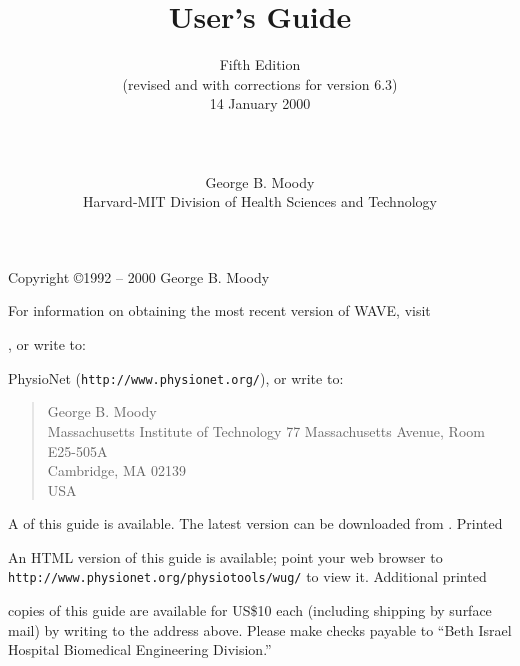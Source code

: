 \documentclass[twoside]{book}
\title{\WAVE{} User's Guide}
\author{Fifth Edition\\
(revised and with corrections for \WAVE{} version 6.3)\\
14 January 2000\\
\\
\\
\\
George B. Moody\\
Harvard-MIT Division of Health Sciences and Technology}
\date{}
\newcommand{\WAVE}{{\sf WAVE}\xspace}
\begin{document}
\begin{htmlonly}
\end{htmlonly}
\begin{latexonly}
\end{latexonly}

\maketitle

\pagestyle{empty}
\vspace*{\fill}
\noindent
Copyright \copyright 1992 -- 2000 George B. Moody

\vspace{1 in}
\noindent
For information on obtaining the most recent version of \WAVE{},
visit
\begin{htmlonly}
, or write to:
\end{htmlonly}
\begin{latexonly}
PhysioNet ({\tt http://www.physionet.org/}), or write to:
\end{latexonly}

\begin{quote}
George B. Moody\\
Massachusetts Institute of Technology
77 Massachusetts Avenue, Room E25-505A\\
Cambridge, MA 02139\\
USA\\
\end{quote}

\begin{htmlonly}
\noindent
A  of this guide is available.
The latest version can be downloaded from
.  Printed
\end{htmlonly}
\begin{latexonly}
\noindent
An HTML version of this guide is available; point your web browser to
{\tt http://www.\-physio\-net.\-org/\-physio\-tools/\-wug/} to view
it. Additional printed
\end{latexonly}
copies of this guide are available for US\$10 each
(including shipping by surface mail) by writing to the address above.
Please make checks payable to ``Beth Israel Hospital Biomedical
Engineering Division.''
\end{document}
